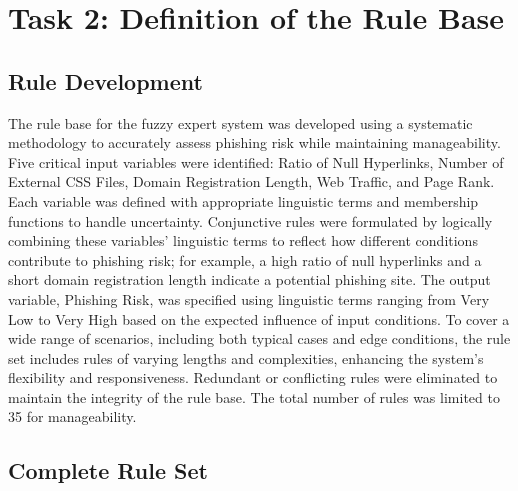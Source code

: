 \documentclass{article}
\begin{document}
\section{Task 2: Definition of the Rule Base}\label{sec:task2}


\subsection{Rule Development}

The rule base for the fuzzy expert system was developed using a systematic methodology to accurately assess phishing risk while maintaining manageability. Five critical input variables were identified: Ratio of Null Hyperlinks, Number of External CSS Files, Domain Registration Length, Web Traffic, and Page Rank. Each variable was defined with appropriate linguistic terms and membership functions to handle uncertainty. Conjunctive rules were formulated by logically combining these variables' linguistic terms to reflect how different conditions contribute to phishing risk; for example, a high ratio of null hyperlinks and a short domain registration length indicate a potential phishing site. The output variable, Phishing Risk, was specified using linguistic terms ranging from Very Low to Very High based on the expected influence of input conditions. To cover a wide range of scenarios, including both typical cases and edge conditions, the rule set includes rules of varying lengths and complexities, enhancing the system's flexibility and responsiveness. Redundant or conflicting rules were eliminated to maintain the integrity of the rule base. The total number of rules was limited to 35 for manageability.

\subsection{Complete Rule Set}
\end{document}
